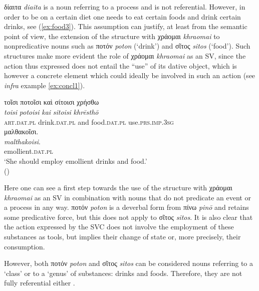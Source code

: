 \documentclass[output=paper,colorlinks,citecolor=brown]{langscibook}
\begin{document}
δίαιτα \textit{diaita} is a noun referring to a process and is not referential. However, in order to be on a certain diet one needs to eat certain foods and drink certain drinks, see (\ref{ex:food3}). This assumption can justify, at least from the semantic point of view, the extension of the structure with χράομαι \textit{khraomai} to nonpredicative nouns such as ποτόν \textit{poton} (‘drink’) and σῖτος \textit{sitos} (‘food’). Such structures make more evident the role of χράομαι \textit{khraomai} as an SV, since the action thus expressed does not entail the “use” of its dative object, which is however a concrete element which could ideally be involved in such an action (see \textit{infra} example \ref{ex:concl1}).

\begin{exe}
\ex\label{ex:food3}
\glll τοῖσι ποτοῖσι καὶ σίτοισι χρήσθω  \\ 
\textit{toisi} \textit{potoisi} \textit{kai} \textit{sitoisi} \textit{khrēsthō} \\
\textsc{art.dat.pl} drink.\textsc{dat.pl} and food.\textsc{dat.pl} use.\textsc{prs.imp.3sg}  \\

\glll μαλθακοῖσι. \\
\textit{malthakoisi}. \\
emollient.\textsc{dat.pl} \\
\glt ‘She should employ emollient drinks and food.' \\
\hspace*{\fill}()
\end{exe}

Here one can see a first step towards the use of the structure with χράομαι \textit{khraomai} as an SV in combination with nouns that do not predicate an event or a process in any way. ποτόν \textit{poton} is a deverbal form from πίνω \textit{pinō} and retains some predicative force, but this does not apply to σῖτος \textit{sitos}. It is also clear that the action expressed by the SVC does not involve the employment of these substances as tools, but implies their change of state or, more precisely, their consumption. 

However, both ποτόν \textit{poton} and σῖτος \textit{sitos} can be considered nouns referring to a ‘class’ or to a ‘genus’ of substances: drinks and foods. Therefore, they are not fully referential either \citep[293--295]{Givón1978}.
\end{document}
